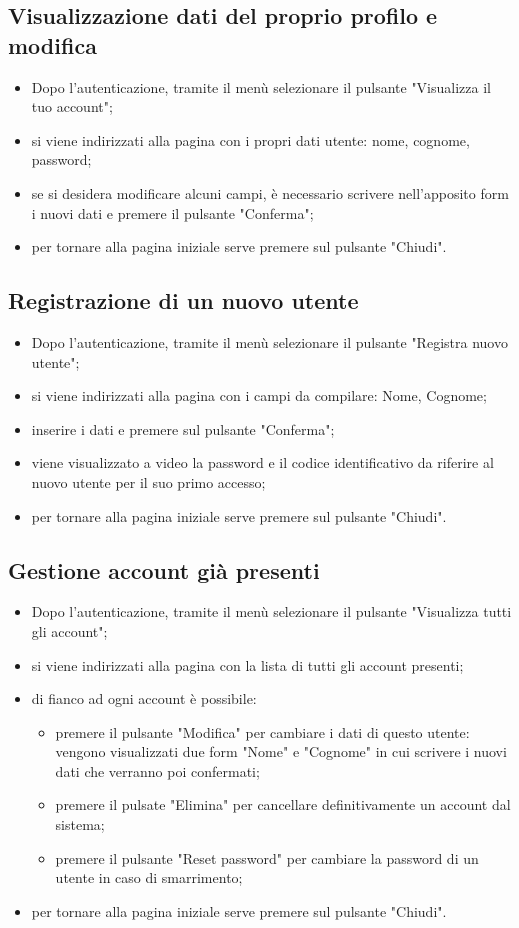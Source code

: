 \subsection{Visualizzazione dati del proprio profilo e modifica}
\begin{itemize}
    \item Dopo l'autenticazione, tramite il menù selezionare il pulsante "Visualizza il tuo account";
    \item si viene indirizzati alla pagina con i propri dati utente: nome, cognome, password;
    \item se si desidera modificare alcuni campi, è necessario scrivere nell'apposito form i nuovi dati e premere il pulsante "Conferma";
    \item per tornare alla pagina iniziale serve premere sul pulsante "Chiudi".
\end{itemize}
\subsection{Registrazione di un nuovo utente}
\begin{itemize}
    \item Dopo l'autenticazione, tramite il menù selezionare il pulsante "Registra nuovo utente";
    \item si viene indirizzati alla pagina con i campi da compilare: Nome, Cognome;
    \item inserire i dati e premere sul pulsante "Conferma";
    \item viene visualizzato a video la password e il codice identificativo da riferire al nuovo utente per il suo primo accesso;
    \item per tornare alla pagina iniziale serve premere sul pulsante "Chiudi".
\end{itemize}
\subsection{Gestione account già presenti}
\begin{itemize}
    \item Dopo l'autenticazione, tramite il menù selezionare il pulsante "Visualizza tutti gli account";
    \item si viene indirizzati alla pagina con la lista di tutti gli account presenti;
    \item di fianco ad ogni account è possibile:
        \begin{itemize}
            \item premere il pulsante "Modifica" per cambiare i dati di questo utente: vengono visualizzati due form "Nome" e "Cognome" in cui scrivere i nuovi dati che verranno poi confermati;
            \item premere il pulsate "Elimina" per cancellare definitivamente un account dal sistema;
            \item premere il pulsante "Reset password" per cambiare la password di un utente in caso di smarrimento;
        \end{itemize}
    \item per tornare alla pagina iniziale serve premere sul pulsante "Chiudi".
\end{itemize}
